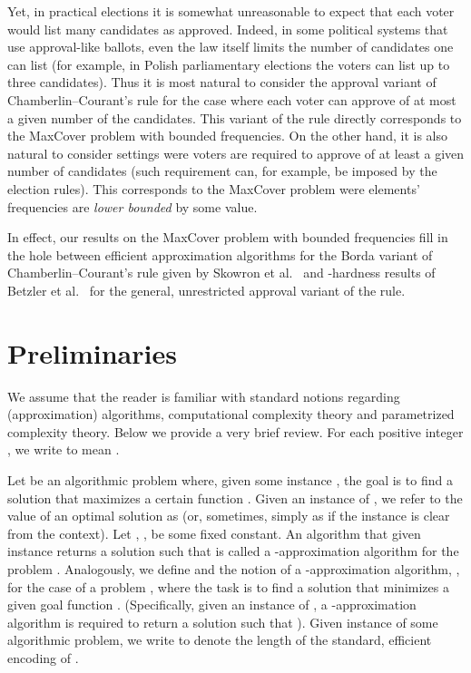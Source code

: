 \documentclass[11pt]{article}
\begin{document}
Yet, in practical elections it is somewhat unreasonable to expect that
each voter would list many candidates as approved.  Indeed, in some
political systems that use approval-like ballots, even the law itself
limits the number of candidates one can list (for example, in Polish
parliamentary elections the voters can list up to three
candidates). Thus it is most natural to consider the approval variant
of Chamberlin--Courant's rule for the case where each voter can
approve of at most a given number  of the candidates. This variant
of the rule directly corresponds to the MaxCover problem with bounded
frequencies. On the other hand, it is also natural to consider
settings were voters are required to approve of at least a given
number of candidates (such requirement can, for example, be imposed by
the election rules). This corresponds to the MaxCover problem were
elements' frequencies are \emph{lower bounded} by some value.


In effect, our results on the MaxCover problem with bounded
frequencies fill in the hole between efficient approximation
algorithms for the Borda variant of Chamberlin--Courant's rule given
by Skowron et al.~\cite{sko-fal-sli:c:multiwinner} and
-hardness results of Betzler et
al.~\cite{fullyProportionalRepr} for the general, unrestricted
approval variant of the rule.
























\section{Preliminaries}\label{sec:prelims}

We assume that the reader is familiar with standard notions regarding
(approximation) algorithms, computational complexity theory and
parametrized complexity theory. Below we provide a very brief review.
For each positive integer , we write  to mean . 

Let  be an algorithmic problem where, given some instance ,
the goal is to find a solution  that maximizes a certain function
.  Given an instance  of , we refer to the value 
of an optimal solution  as  (or, sometimes, simply as
 if the instance  is clear from the context). Let , , be some fixed constant.  An algorithm  that
given instance  returns a solution  such that  is called a -approximation algorithm for the
problem .
Analogously, we define  and the notion of a
-approximation algorithm, , for the case of a
problem , where the task is to find a solution that minimizes
a given goal function . (Specifically, given an instance  of
, a -approximation algorithm is required to return a
solution  such that ).  Given instance 
of some algorithmic problem, we write  to denote the length of
the standard, efficient encoding of .
\end{document}
